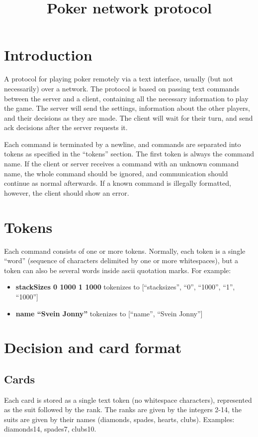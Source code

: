 \documentclass{article}
\title{Poker network protocol}
\begin{document}
\maketitle

\section{Introduction}
A protocol for playing poker remotely via a text interface, usually (but not necessarily) over a network. The protocol is based on passing text commands between the server and a client, containing all the necessary information to play the game. The server will send the settings, information about the other players, and their decisions as they are made. The client will wait for their turn, and send ack decisions after the server requests it.

Each command is terminated by a newline, and commands are separated into tokens as specified in the ``tokens'' section. The first token is always the command name. If the client or server receives a command with an unknown command name, the whole command should be ignored, and communication should continue as normal afterwards. If a known command is illegally formatted, however, the client should show an error.

\section{Tokens}
Each command consists of one or more tokens. Normally, each token is a single ``word'' (sequence of characters delimited by one or more whitespaces), but a token can also be several words inside ascii quotation marks. For example:
\begin{itemize}
\item \textbf{stackSizes 0 1000 1 1000} tokenizes to [``stacksizes'', ``0'', ``1000'', ``1'', ``1000'']
\item \textbf{name ``Svein Jonny''} tokenizes to [``name'', ``Svein Jonny'']
\end{itemize}

\section{Decision and card format}
\subsection*{Cards}
Each card is stored as a single text token (no whitespace characters), represented as the suit followed by the rank. The ranks are given by the integers 2-14, the suits are given by their names (diamonds, spades, hearts, clubs). Examples: diamonds14, spades7, clubs10.
\end{document}
